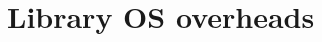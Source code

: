 \section{Library OS overheads}
\label{sec:eval:libos}

\makeatletter
{}
\makeatother
\graphicspath{{eval/emu/figures/}}






\makeatletter
{}
\makeatother
\graphicspath{{eval/figures/}}
